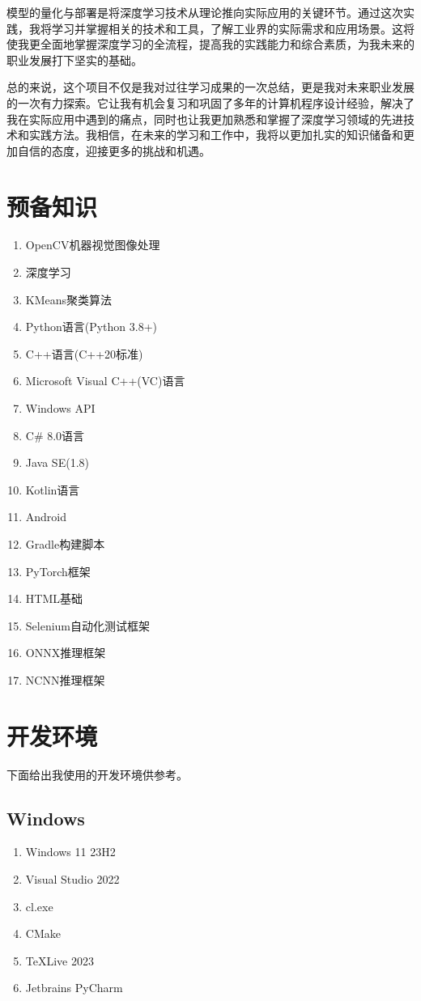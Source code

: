 模型的量化与部署是将深度学习技术从理论推向实际应用的关键环节。通过这次实践，我将学习并掌握相关的技术和工具，了解工业界的实际需求和应用场景。这将使我更全面地掌握深度学习的全流程，提高我的实践能力和综合素质，为我未来的职业发展打下坚实的基础。

总的来说，这个项目不仅是我对过往学习成果的一次总结，更是我对未来职业发展的一次有力探索。它让我有机会复习和巩固了多年的计算机程序设计经验，解决了我在实际应用中遇到的痛点，同时也让我更加熟悉和掌握了深度学习领域的先进技术和实践方法。我相信，在未来的学习和工作中，我将以更加扎实的知识储备和更加自信的态度，迎接更多的挑战和机遇。

\section{预备知识}

\begin{enumerate}
	\item OpenCV机器视觉图像处理
	\item 深度学习
	\item KMeans聚类算法
	\item Python语言(Python 3.8+)
	\item C++语言(C++20标准)
	\item Microsoft Visual C++(VC)语言
	\item Windows API
	\item C\# 8.0语言
	\item Java SE(1.8)
	\item Kotlin语言
	\item Android
	\item Gradle构建脚本
	\item PyTorch框架
	\item HTML基础
	\item Selenium自动化测试框架
	\item ONNX推理框架
	\item NCNN推理框架
\end{enumerate}

\section{开发环境}

下面给出我使用的开发环境供参考。

\subsection{Windows}

\begin{enumerate}
	\item Windows 11 23H2
	\item Visual Studio 2022
	\item cl.exe
	\item CMake
	\item TeXLive 2023
	\item Jetbrains PyCharm
\end{enumerate}


